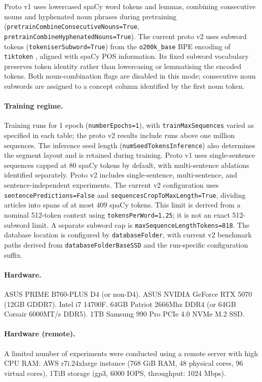 Proto v1 uses lowercased spaCy word tokens and lemmas, combining consecutive nouns and hyphenated noun phrases during pretraining (\texttt{pretrainCombineConsecutiveNouns=True}, \texttt{pretrainCombineHyphenatedNouns=True}). The current proto v2 uses subword tokens (\texttt{tokeniserSubword=True}) from the \texttt{o200k_base} BPE encoding of \texttt{tiktoken} \citep{openai2022tiktoken}, aligned with spaCy POS information. Its fixed subword vocabulary preserves token identity rather than lowercasing or lemmatising the encoded tokens. Both noun-combination flags are disabled in this mode; consecutive noun subwords are assigned to a concept column identified by the first noun token.

\paragraph{Training regime.}
Training runs for 1 epoch (\texttt{numberEpochs=1}), with \texttt{trainMaxSequences} varied as specified in each table; the proto v2 results include runs above one million sequences. The inference seed length (\texttt{numSeedTokensInference}) also determines the segment layout and is retained during training. Proto v1 uses single-sentence sequences capped at 80 spaCy tokens by default, with multi-sentence ablations identified separately. Proto v2 includes single-sentence, multi-sentence, and sentence-independent experiments. The current v2 configuration uses \texttt{sentencePredictions=False} and \texttt{sequencesCropToMaxLength=True}, dividing articles into spans of at most 409 spaCy tokens. This limit is derived from a nominal 512-token context using \texttt{tokensPerWord=1.25}; it is not an exact 512-subword limit. A separate subword cap is \texttt{maxSequenceLengthTokens=818}. The database location is configured by \texttt{databaseFolder}, with current v2 benchmark paths derived from \texttt{databaseFolderBaseSSD} and the run-specific configuration suffix.

\paragraph{Hardware.}
ASUS PRIME B760-PLUS D4 (or non-D4). ASUS NVIDIA GeForce RTX 5070 (12GB GDDR7). Intel i7 14700F. 64GB Patriot 2666Mhz DDR4 (or 64GB Corsair 6000MT/s DDR5). 1TB Samsung 990 Pro PCIe 4.0 NVMe M.2 SSD.

\paragraph{Hardware (remote).}
A limited number of experiments were conducted using a remote server with high CPU RAM: AWS r7i.24xlarge instance (768 GiB RAM, 48 physical cores, 96 virtual cores), 1TiB storage (gp3, 6000 IOPS, throughput: 1024 Mbps).

